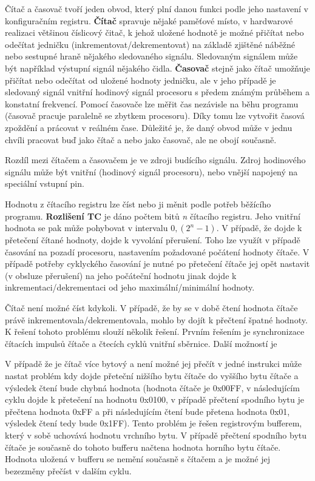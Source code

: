 Čítač a časovač tvoří jeden obvod, který plní danou funkci podle jeho nastavení v konfiguračním registru. {\bf Čítač} spravuje nějaké paměťové místo, v hardwarové realizaci většinou číslicový čitač, k jehož uložené hodnotě je možné přičítat nebo odečítat jedničku (inkre\-men\-to\-vat/dekre\-men\-to\-vat) na základě zjištěné náběžné nebo sestupné hraně nějakého sledovaného signálu. Sledovaným signálem může být například výstupní signál nějakého čidla. {\bf Časovač} stejně jako čítač umožňuje přičítat nebo odečítat od uložené hodnoty jedničku, ale v jeho případě je sledovaný signál vnitřní hodinový signál procesoru s předem známým průběhem a konstatní frekvencí. Pomocí časovače lze měřit čas nezávisle na běhu programu (časovač pracuje paralelně se zbytkem procesoru). Díky tomu lze vytvořit časová zpoždění a prácovat v reálném čase. Důležité je, že daný obvod může v jednu chvíli pracovat buď jako čítač a nebo jako časovač, ale ne obojí současně. 

Rozdíl mezi čítačem a časovačem je ve zdroji budícího signálu. Zdroj hodinového signálu může být vnitřní (hodinový signál procesoru), nebo vnější napojený na speciální vstupní pin. 

Hodnotu z čítacího registru lze číst nebo ji měnit podle potřeb běžícího programu. {\bf Rozlišení TC} je dáno počtem bitů {\it n} čítacího registru. Jeho vnitřní hodnota se pak může pohybovat v intervalu $0 , (2^n - 1)$. V případě, že dojde k přetečení čítané hodnoty, dojde k vyvolání přerušení. Toho lze  využít v případě časování na pozadí procesoru, nastavením požadované počátení hodnoty čítače. V případě potřeby cyklyckého časování je nutné po přetečení čítače jej opět nastavit (v obsluze přerušení) na jeho počáteční hodnotu jinak dojde k inkrementaci/dekrementaci od jeho maximální/minimální hodnoty.


Čítač není možné číst kdykoli. V případě, že by se v době čtení hodnota čítače právě inkrementovala/dekrementovala, mohlo by dojít k přečtení špatné hodnoty. K řešení tohoto problému slouží několik řešení. Prvním řešením je synchronizace čítacích impulsů čítače a čtecích cyklů vnitřní sběrnice. Další možností je 

V případě že je čítač více bytový a není možné jej přečít v jedné instrukci může nastat problém kdy dojde přeteční nižšího bytu čítače do vyššího bytu čítače a výsledek čtení bude chybná hodnota (hodnota čítače je 0x00FF, v následujícím cyklu dojde k přetečení na hodnotu 0x0100, v případě přečtení spodního bytu je přečtena hodnota 0xFF a při následujícím čtení bude přetena hodnota 0x01, výsledek čtení tedy bude 0x1FF). Tento problém je řešen registrovým bufferem, který v sobě uchovává hodnotu vrchního bytu. V případě přečtení spodního bytu čítače je současně do tohoto bufferu načtena hodnota horního bytu čítače. Hodnota uložená v bufferu se nemění současně s čítačem a je možné jej bezezměny přečíst v dalším cyklu.

